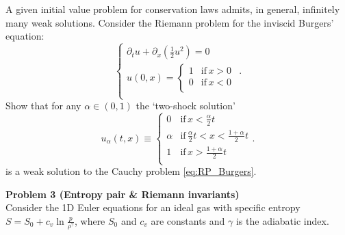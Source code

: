 \documentclass[letter,11pt]{article}
\begin{document}
\noindent A given initial value problem for conservation laws admits, in general, infinitely many weak solutions. Consider the Riemann problem for the inviscid Burgers' equation:
\begin{equation}
  \left\{ \begin{array}{l}
  \partial_t u + \partial_x\left(\frac{1}{2}u^2\right) = 0 \\
  u(0,x) = \left\{ \begin{array}{cc}
  1 & \mathrm{if}\, x>0 \\
  0 & \mathrm{if}\, x<0 \\
  \end{array}\right.\\
  \end{array}\right.. \label{eq:RP_Burgers}
  \end{equation}
Show that for any $\alpha\in(0,1)$ the `two-shock solution'
\begin{equation}
  u_\alpha(t,x) \equiv \left\{ \begin{array}{ll}
    0 & \mathrm{if}\, x< \frac{\alpha}{2}t \\
    \alpha & \mathrm{if}\, \frac{\alpha}{2}t<x<\frac{1+\alpha}{2}t \\
    1 & \mathrm{if}\, x>\frac{1+\alpha}{2}t \\
  \end{array}\right. .
\end{equation}
is a weak solution to the Cauchy problem \eqref{eq:RP_Burgers}.


\newpage
\phantom{.}

{\noindent\large\textbf{Problem 3 (Entropy pair \& Riemann invariants)}}\\

\noindent Consider the 1D Euler equations for an ideal gas with specific entropy $S = S_0 + c_v\ln\frac{p}{\rho^\gamma}$, where $S_0$ and $c_v$ are constants and $\gamma$ is the adiabatic index.
\end{document}
